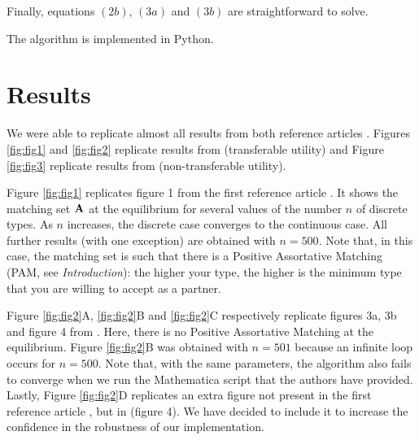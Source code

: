 Finally, equations $(2b)$, $(3a)$ and $(3b)$ are straightforward to solve.

The algorithm is implemented in Python.





\section*{Results}

We were able to replicate almost all results from both reference articles \citep{shimer_assortative_2000,smith_marriage_2006}. Figures \ref{fig:fig1} and \ref{fig:fig2} replicate results from \citep{shimer_assortative_2000} (transferable utility) and Figure \ref{fig:fig3} replicate results from \citep{smith_marriage_2006} (non-transferable utility).

Figure \ref{fig:fig1} replicates figure 1 from the first reference article \citep{shimer_assortative_2000}. It shows the matching set $\boldsymbol{\mathbf{A}}$ at the equilibrium for several values of the number $n$ of discrete types. As $n$ increases, the discrete case converges to the continuous case. All further results (with one exception) are obtained with $n=500$. Note that, in this case, the matching set is such that there is a Positive Assortative Matching (PAM, see \textit{Introduction}): the higher your type, the higher is the minimum type that you are willing to accept as a partner.

Figure \ref{fig:fig2}A, \ref{fig:fig2}B and \ref{fig:fig2}C respectively replicate figures 3a, 3b and figure 4 from \citep{shimer_assortative_2000}. Here, there is no Positive Assortative Matching at the equilibrium. Figure \ref{fig:fig2}B was obtained with $n=501$ because an infinite loop occurs for $n=500$. Note that, with the same parameters, the algorithm also fails to converge when we run the Mathematica script that the authors have provided. Lastly, Figure \ref{fig:fig2}D replicates an extra figure not present in the first reference article \citep{shimer_assortative_2000}, but in \citep{smith_frictional_2011} (figure 4). We have decided to include it to increase the confidence in the robustness of our implementation.


